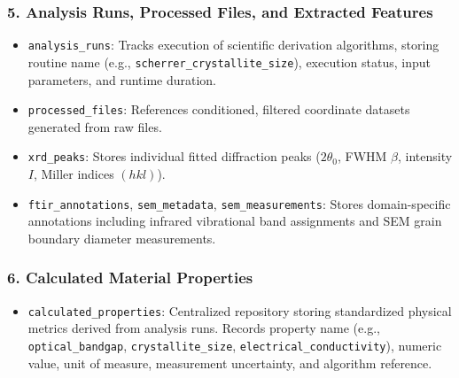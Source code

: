 \documentclass[12pt,a4paper,oneside]{report}
\begin{document}
{{{\subsubsection{5. Analysis Runs, Processed Files, and Extracted Features}
\begin{itemize}
    \item \texttt{analysis\_runs}: Tracks execution of scientific derivation algorithms, storing routine name (e.g., \texttt{scherrer\_crystallite\_size}), execution status, input parameters, and runtime duration.
    \item \texttt{processed\_files}: References conditioned, filtered coordinate datasets generated from raw files.
    \item \texttt{xrd\_peaks}: Stores individual fitted diffraction peaks ($2\theta_0$, FWHM $\beta$, intensity $I$, Miller indices $(hkl)$).
    \item \texttt{ftir\_annotations}, \texttt{sem\_metadata}, \texttt{sem\_measurements}: Stores domain-specific annotations including infrared vibrational band assignments and SEM grain boundary diameter measurements.
\end{itemize}

\subsubsection{6. Calculated Material Properties}
\begin{itemize}
    \item \texttt{calculated\_properties}: Centralized repository storing standardized physical metrics derived from analysis runs. Records property name (e.g., \texttt{optical\_bandgap}, \texttt{crystallite\_size}, \texttt{electrical\_conductivity}), numeric value, unit of measure, measurement uncertainty, and algorithm reference.
\end{itemize}

}}}
\end{document}
